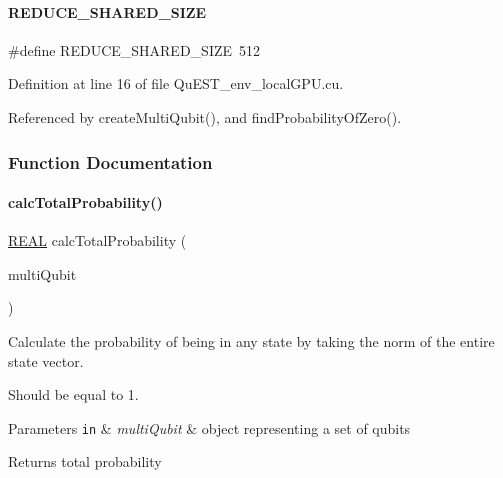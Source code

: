 \paragraph{\texorpdfstring{R\+E\+D\+U\+C\+E\+\_\+\+S\+H\+A\+R\+E\+D\+\_\+\+S\+I\+ZE}{REDUCE\_SHARED\_SIZE}}
{\footnotesize\ttfamily \#define R\+E\+D\+U\+C\+E\+\_\+\+S\+H\+A\+R\+E\+D\+\_\+\+S\+I\+ZE~512}



Definition at line 16 of file Qu\+E\+S\+T\+\_\+env\+\_\+local\+G\+P\+U.\+cu.



Referenced by create\+Multi\+Qubit(), and find\+Probability\+Of\+Zero().



\subsubsection{Function Documentation}
\mbox{\label{QuEST__env__localGPU_8cu_a818a4c7cd7252d2b10b896b12fa431d3}} 
\paragraph{\texorpdfstring{calc\+Total\+Probability()}{calcTotalProbability()}}
{\footnotesize\ttfamily \mbox{\hyperlink{QuEST__precision_8h_a4b654506f18b8bfd61ad2a29a7e38c25}{R\+E\+AL}} calc\+Total\+Probability (\begin{DoxyParamCaption}\item[{\mbox{\hyperlink{structMultiQubit}{Multi\+Qubit}}}]{multi\+Qubit }\end{DoxyParamCaption})}



Calculate the probability of being in any state by taking the norm of the entire state vector. 

Should be equal to 1.


\begin{DoxyParams}[1]{Parameters}
\mbox{\tt in}  & {\em multi\+Qubit} & object representing a set of qubits \\
\hline
\end{DoxyParams}
\begin{DoxyReturn}{Returns}
total probability 
\end{DoxyReturn}



